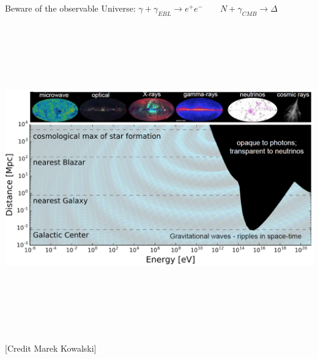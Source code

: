 \Tr
\onecolumn
\begin{center}
{\blue Beware of the observable Universe:
 $\gamma+\gamma_{EBL}\rightarrow e^{+}e^{-} \qquad N+\gamma_{CMB} \rightarrow \Delta$}\\
\includegraphics[keepaspectratio,height=14cm]{marek}\\
{\large [Credit Marek Kowalski]}
\end{center}

\twocolumn
